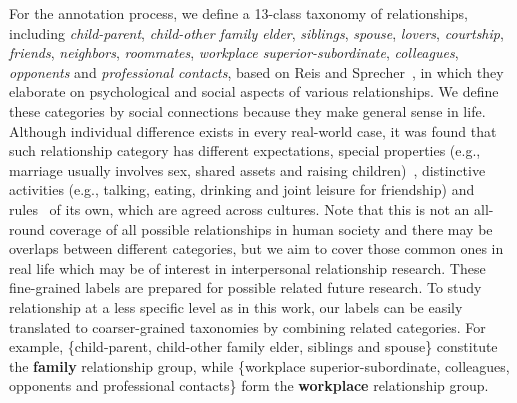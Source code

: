 For the annotation process, we define a 13-class taxonomy of relationships, 
including {\em child-parent}, {\em child-other family elder}, {\em siblings}, {\em spouse}, {\em lovers}, {\em courtship}, {\em friends}, {\em neighbors}, {\em roommates}, 
{\em workplace superior-subordinate}, {\em colleagues}, {\em opponents} and 
{\em professional contacts},
based on Reis and Sprecher~\cite{encyclopaedia}, 
in which they elaborate on psychological 
and social aspects of various relationships. 
We define these categories by social connections because they make general 
sense in life. Although individual difference exists 
in every real-world case, it was found that such relationship category 
has different expectations, 
special properties (e.g., marriage usually involves sex, 
shared assets and raising children)~\cite{class-property}, 
distinctive activities (e.g., talking, eating, drinking and 
joint leisure for friendship) and 
rules~\cite{class-rules} of its own, which are agreed across cultures.
Note that this is not an all-round coverage of 
all possible relationships in human society and there may be
overlaps between different categories, but we aim to cover those common
ones in real life which may be of interest in interpersonal 
relationship research.
These fine-grained labels are prepared for possible related future research.
To study relationship at a less specific level as in this work, 
our labels can be easily translated to coarser-grained taxonomies 
by combining related categories. For example, \{child-parent, child-other family elder, siblings and spouse\} constitute the \textbf{family} relationship group,
while \{workplace superior-subordinate, colleagues, opponents and professional
contacts\} form the \textbf{workplace} relationship group.

